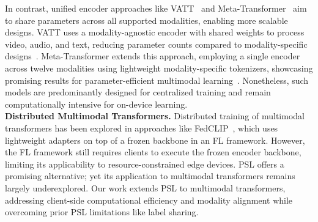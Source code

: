 In contrast, unified encoder approaches like VATT~\cite{vatt} and Meta-Transformer~\cite{meta-transformer} aim to share parameters across all supported modalities, enabling more scalable designs. VATT uses a modality-agnostic encoder with shared weights to process video, audio, and text, reducing parameter counts compared to modality-specific designs~\cite{vatt}. Meta-Transformer extends this approach, employing a single encoder across twelve modalities using lightweight modality-specific tokenizers, showcasing promising results for parameter-efficient multimodal learning~\cite{meta-transformer}. Nonetheless, such models are predominantly designed for centralized training and remain computationally intensive for on-device learning. \\

\noindent \textbf{Distributed Multimodal Transformers.} Distributed training of multimodal transformers has been explored in approaches like FedCLIP~\cite{FedCLIP}, which uses lightweight adapters on top of a frozen backbone in an FL framework. However, the FL framework still requires clients to execute the frozen encoder backbone, limiting its applicability to resource-constrained edge devices. PSL offers a promising alternative; yet its application to multimodal transformers remains largely underexplored.
Our work extends PSL to multimodal transformers, addressing client-side computational efficiency and modality alignment while overcoming prior PSL limitations like label sharing.